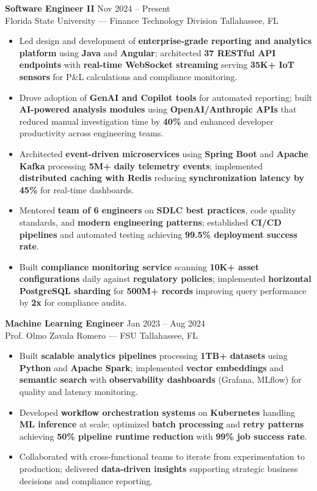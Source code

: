 \documentclass[letterpaper,10pt]{article}
\newcommand{\resumeItem}[1]{\item\small #1}
\newcommand{\resumeSubheading}[4]{
  \vspace{6pt}
  \noindent
  \textbf{#1} \hfill {\footnotesize #2} \\
  [-1pt]
  \noindent
  \small #3 \hfill {\small #4}
  \vspace{3pt}
}
\newcommand{\resumeItemsStart}{\vspace{-2pt}\begin{itemize}}
\newcommand{\resumeItemsEnd}{\end{itemize}\vspace{6pt}}
\begin{document}
\resumeSubheading
{Software Engineer II}{Nov 2024 -- Present}
{Florida State University — Finance Technology Division}{Tallahassee, FL}
\resumeItemsStart
\resumeItem{Led design and development of \textbf{enterprise-grade reporting and analytics platform} using \textbf{Java} and \textbf{Angular}; architected \textbf{37 RESTful API endpoints} with \textbf{real-time WebSocket streaming} serving \textbf{35K+ IoT sensors} for P\&L calculations and compliance monitoring.}
\resumeItem{Drove adoption of \textbf{GenAI and Copilot tools} for automated reporting; built \textbf{AI-powered analysis modules} using \textbf{OpenAI/Anthropic APIs} that reduced manual investigation time by \textbf{40\%} and enhanced developer productivity across engineering teams.}
\resumeItem{Architected \textbf{event-driven microservices} using \textbf{Spring Boot} and \textbf{Apache Kafka} processing \textbf{5M+ daily telemetry events}; implemented \textbf{distributed caching with Redis} reducing \textbf{synchronization latency by 45\%} for real-time dashboards.}
\resumeItem{Mentored \textbf{team of 6 engineers} on \textbf{SDLC best practices}, code quality standards, and \textbf{modern engineering patterns}; established \textbf{CI/CD pipelines} and automated testing achieving \textbf{99.5\% deployment success rate}.}
\resumeItem{Built \textbf{compliance monitoring service} scanning \textbf{10K+ asset configurations} daily against \textbf{regulatory policies}; implemented \textbf{horizontal PostgreSQL sharding} for \textbf{500M+ records} improving query performance by \textbf{2x} for compliance audits.}
\resumeItemsEnd
\vspace{-12pt}

\resumeSubheading
{Machine Learning Engineer}{Jan 2023 -- Aug 2024}
{Prof. Olmo Zavala Romero — FSU}{Tallahassee, FL}
\resumeItemsStart
\resumeItem{Built \textbf{scalable analytics pipelines} processing \textbf{1TB+ datasets} using \textbf{Python} and \textbf{Apache Spark}; implemented \textbf{vector embeddings} and \textbf{semantic search} with \textbf{observability dashboards} (Grafana, MLflow) for quality and latency monitoring.}
\resumeItem{Developed \textbf{workflow orchestration systems} on \textbf{Kubernetes} handling \textbf{ML inference} at scale; optimized \textbf{batch processing} and \textbf{retry patterns} achieving \textbf{50\% pipeline runtime reduction} with \textbf{99\% job success rate}.}
\resumeItem{Collaborated with cross-functional teams to iterate from experimentation to production; delivered \textbf{data-driven insights} supporting strategic business decisions and compliance reporting.}
\resumeItemsEnd
\vspace{-12pt}
\end{document}
